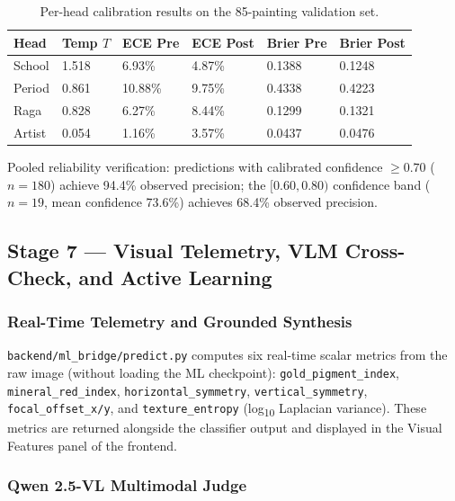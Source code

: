 \documentclass[12pt, a4paper, twoside]{article}
\begin{document}
\begin{table}[H]
  \centering
  \caption{Per-head calibration results on the 85-painting validation set.}
  \label{tab:calibration}
  \begin{tabularx}{\linewidth}{L{2.4cm} C{1.5cm} C{1.6cm} C{1.6cm} C{1.6cm} C{1.6cm}}
    \toprule
    \textbf{Head} & \textbf{Temp $T$} & \textbf{ECE Pre} & \textbf{ECE Post} & \textbf{Brier Pre} & \textbf{Brier Post}\\
    \midrule
    School  & 1.518 & 6.93\% & 4.87\% & 0.1388 & 0.1248\\
    Period  & 0.861 & 10.88\%& 9.75\% & 0.4338 & 0.4223\\
    Raga    & 0.828 & 6.27\% & 8.44\% & 0.1299 & 0.1321\\
    Artist  & 0.054 & 1.16\% & 3.57\% & 0.0437 & 0.0476\\
    \bottomrule
  \end{tabularx}
\end{table}

Pooled reliability verification: predictions with calibrated confidence $\geq 0.70$ ($n = 180$) achieve 94.4\% observed precision; the $[0.60, 0.80)$ confidence band ($n = 19$, mean confidence 73.6\%) achieves 68.4\% observed precision.

\subsection{Stage 7 — Visual Telemetry, VLM Cross-Check, and Active Learning}

\subsubsection{Real-Time Telemetry and Grounded Synthesis}

\texttt{backend/ml\_bridge/predict.py} computes six real-time scalar metrics from the raw image (without loading the ML checkpoint): \texttt{gold\_pigment\_index}, \texttt{mineral\_red\_index}, \texttt{horizontal\_symmetry}, \texttt{vertical\_symmetry}, \texttt{focal\_offset\_x/y}, and \texttt{texture\_entropy} (log\textsubscript{10} Laplacian variance). These metrics are returned alongside the classifier output and displayed in the Visual Features panel of the frontend.

\subsubsection{Qwen 2.5-VL Multimodal Judge}
\end{document}
